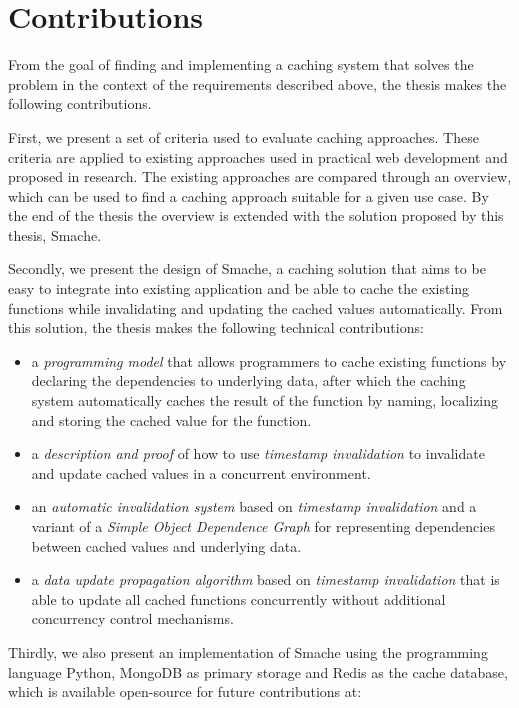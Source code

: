 

\section{Contributions}
\label{sec:contributions}

From the goal of finding and implementing a caching system that solves the problem in the context of the requirements described above, the thesis makes the following contributions.

First, we present a set of criteria used to evaluate caching approaches. These criteria are applied to existing approaches used in practical web development and proposed in research. The existing approaches are compared through an overview, which can be used to find a caching approach suitable for a given use case. By the end of the thesis the overview is extended with the solution proposed by this thesis, Smache.

Secondly, we present the design of Smache, a caching solution that aims to be easy to integrate into existing application and be able to cache the existing functions while invalidating and updating the cached values automatically. From this solution, the thesis makes the following technical contributions:

\begin{itemize}
  \item a \emph{programming model} that allows programmers to cache existing functions by declaring the dependencies to underlying data, after which the caching system automatically caches the result of the function by naming, localizing and storing the cached value for the function.
  \item a \emph{description and proof} of how to use \emph{timestamp invalidation} to invalidate and update cached values in a concurrent environment.
  \item an \emph{automatic invalidation system} based on \emph{timestamp invalidation} and a variant of a \emph{Simple Object Dependence Graph} for representing dependencies between cached values and underlying data.
  \item a \emph{data update propagation algorithm} based on \emph{timestamp invalidation} that is able to update all cached functions concurrently without additional concurrency control mechanisms.
\end{itemize}

Thirdly, we also present an implementation of Smache using the programming language Python, MongoDB as primary storage and Redis as the cache database, which is available open-source for future contributions at:

